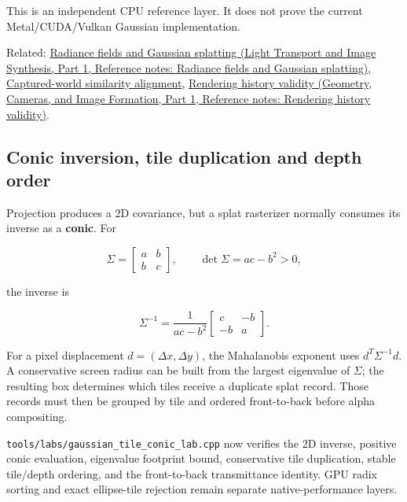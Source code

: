 This is an independent CPU reference layer. It does not prove the current Metal/CUDA/Vulkan Gaussian implementation.

Related: \href{../04-Light-Transport-and-Image-Synthesis-P01/main.pdf\#nameddest=appendix-c5b332e400e7}{Radiance fields and Gaussian splatting (Light Transport and Image Synthesis, Part 1, Reference notes: Radiance fields and Gaussian splatting)}, \hyperref[appendix-5f40b4fea463]{Captured-world similarity alignment}, \href{../03-Geometry-Cameras-and-Image-Formation-P01/main.pdf\#nameddest=appendix-2e7e9fd28a2c}{Rendering history validity (Geometry, Cameras, and Image Formation, Part 1, Reference notes: Rendering history validity)}.

\subsection{Conic inversion, tile duplication and depth order}\label{appendix-24269cb6977c-conic-inversion-tile-duplication-and-depth-order}

\hypertarget{appendix-24269cb6977c-conic-inversion-tile-duplication-and-depth-order}{}

Projection produces a 2D covariance, but a splat rasterizer normally consumes its inverse as a \textbf{conic}. For

\[
\Sigma=
\begin{bmatrix}
a&b\\
b&c
\end{bmatrix},
\qquad
\det\Sigma=ac-b^2>0,
\]

the inverse is

\[
\Sigma^{-1}
=
\frac{1}{ac-b^2}
\begin{bmatrix}
c&-b\\
-b&a
\end{bmatrix}.
\]

For a pixel displacement \(d=(\Delta x,\Delta y)\), the Mahalanobis exponent uses \(d^T\Sigma^{-1}d\). A conservative screen radius can be built from the largest eigenvalue of \(\Sigma\); the resulting box determines which tiles receive a duplicate splat record. Those records must then be grouped by tile and ordered front-to-back before alpha compositing.

\texttt{tools/labs/gaussian\_tile\_conic\_lab.cpp} now verifies the 2D inverse, positive conic evaluation, eigenvalue footprint bound, conservative tile duplication, stable tile/depth ordering, and the front-to-back transmittance identity. GPU radix sorting and exact ellipse-tile rejection remain separate native-performance layers.
